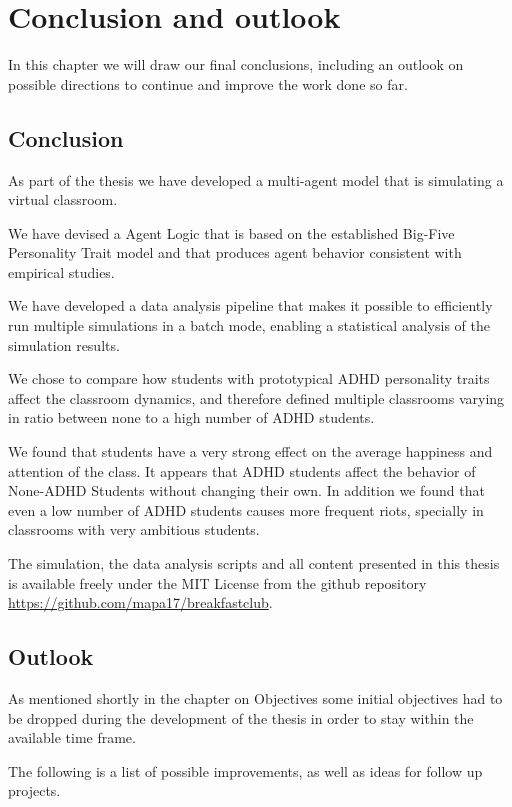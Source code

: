 \chapter{Conclusion and outlook}
In this chapter we will draw our final conclusions, including an outlook on
possible directions to continue and improve the work done so far.

\section{Conclusion}
As part of the thesis we have developed a multi-agent model that is simulating a virtual classroom.

We have devised a Agent Logic that is based on the established Big-Five Personality
Trait model and that produces agent behavior consistent with empirical studies.

We have developed a data analysis pipeline that makes it possible to efficiently
run multiple simulations in a batch mode, enabling a statistical analysis of the
simulation results.

We chose to compare how students with prototypical ADHD personality traits affect
the classroom dynamics, and therefore defined multiple classrooms varying in 
ratio between none to a high number of ADHD students.

We found that students have a very strong effect on the average happiness and attention
of the class. It appears that ADHD students affect the behavior of None-ADHD Students
without changing their own. In addition we found that even a low number of
ADHD students causes more frequent riots, specially in classrooms with very
ambitious students.

The simulation, the data analysis scripts and all content presented in this
thesis is available freely under the MIT License from the github repository \\
\href{https://github.com/mapa17/breakfastclub}{https://github.com/mapa17/breakfastclub}.

\section{Outlook}
As mentioned shortly in the chapter on Objectives some initial objectives had to
be dropped during the development of the thesis in order to stay within the available
time frame.

The following is a list of possible improvements, as well as ideas for follow up projects.

